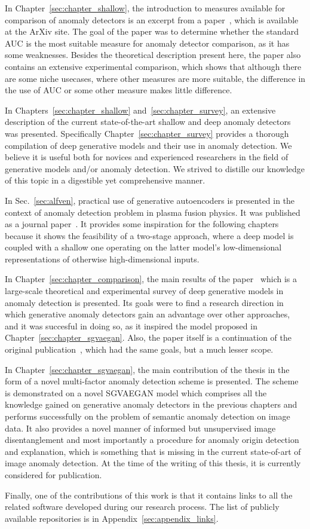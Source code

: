 In Chapter~\ref{sec:chapter_shallow}, the introduction to measures available for comparison of anomaly detectors is an excerpt from a paper~\cite{vskvara2023auc}, which is available at the ArXiv site. The goal of the paper was to determine whether the standard AUC is the most suitable measure for anomaly detector comparison, as it has some weaknesses. Besides the theoretical description present here, the paper also contains an extensive experimental comparison, which shows that although there are some niche usecases, where other measures are more suitable, the difference in the use of AUC or some other measure makes little difference. 

In Chapters~\ref{sec:chapter_shallow} and~\ref{sec:chapter_survey}, an extensive description of the current state-of-the-art shallow and deep anomaly detectors was presented. Specifically Chapter~\ref{sec:chapter_survey} provides a thorough compilation of deep generative models and their use in anomaly detection. We believe it is useful both for novices and experienced researchers in the field of generative models and/or anomaly detection. We strived to distille our knowledge of this topic in a digestible yet comprehensive manner. 

In Sec.~\ref{sec:alfven}, practical use of generative autoencoders is presented in the context of anomaly detection problem in plasma fusion physics. It was published as a journal paper~\cite{vskvara2020detection}. It provides some inspiration for the following chapters because it shows the feasibility of a two-stage approach, where a deep model is coupled with a shallow one operating on the latter model's low-dimensional representations of otherwise high-dimensional inputs.

In Chapter~\ref{sec:chapter_comparison}, the main results of the paper~\cite{vskvara2021comparison} which is a large-scale theoretical and experimental survey of deep generative models in anomaly detection is presented. Its goals were to find a research direction in which generative anomaly detectors gain an advantage over other approaches, and it was succesful in doing so, as it inspired the model proposed in Chapter~\ref{sec:chapter_sgvaegan}. Also, the paper itself is a continuation of the original publication~\cite{vskvara2018generative}, which had the same goals, but a much lesser scope.

In Chapter~\ref{sec:chapter_sgvaegan}, the main contribution of the thesis in the form of a novel multi-factor anomaly detection scheme is presented. The scheme is demonstrated on a novel SGVAEGAN model which comprises all the knowledge gained on generative anomaly detectors in the previous chapters and performs successfully on the problem of semantic anomaly detection on image data. It also provides a novel manner of informed but unsupervised image disentanglement and most importantly a procedure for anomaly origin detection and explanation, which is something that is missing in the current state-of-art of image anomaly detection. At the time of the writing of this thesis, it is currently considered for publication.

Finally, one of the contributions of this work is that it contains links to all the related software developed during our research process. The list of publicly available repositories is in Appendix~\ref{sec:appendix_links}.

